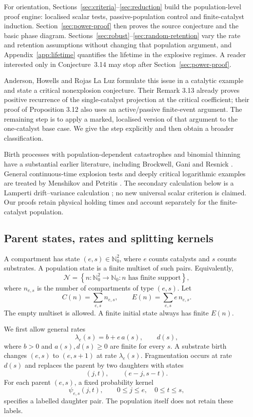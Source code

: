 \documentclass[11pt,a4paper]{article}
\theoremstyle{remark}\newtheorem{remark}[theorem]{Remark}
\newcommand{\Nzero}{\mathbb N_0}
\newcommand{\state}{\mathcal N}
\begin{document}
For orientation, Sections~\ref{sec:criteria}--\ref{sec:reduction} build the population-level proof engine: localised scalar tests, passive-population control and finite-catalyst induction. Section~\ref{sec:power-proof} then proves the source conjecture and the basic phase diagram. Sections~\ref{sec:robust}--\ref{sec:random-retention} vary the rate and retention assumptions without changing that population argument, and Appendix~\ref{app:lifetime} quantifies the lifetime in the explosive regimes. A reader interested only in Conjecture~3.14 may stop after Section~\ref{sec:power-proof}.

Anderson, Howells and Rojas La Luz \cite{anderson2026} formulate this issue in a catalytic example and state a critical nonexplosion conjecture. Their Remark 3.13 already proves positive recurrence of the single-catalyst projection at the critical coefficient; their proof of Proposition 3.12 also uses an active/passive finite-event argument. The remaining step is to apply a marked, localised version of that argument to the one-catalyst base case. We give the step explicitly and then obtain a broader classification.

Birth processes with population-dependent catastrophes and binomial thinning have a substantial earlier literature, including Brockwell, Gani and Resnick \cite{brockwell1982}. General continuous-time explosion tests and deeply critical logarithmic examples are treated by Menshikov and Petritis \cite{menshikov2014}. The secondary calculation below is a Lamperti drift--variance calculation \cite{lamperti1960,lo2024}; no new universal scalar criterion is claimed. Our proofs retain physical holding times and account separately for the finite-catalyst population.

\subsection{Parent states, rates and splitting kernels}

A compartment has state $(e,s)\in\Nzero^2$, where $e$ counts catalysts and $s$ counts substrates. A population state is a finite multiset of such pairs. Equivalently,
\[
\state=\left\{n:\Nzero^2\longrightarrow\Nzero:
                    n\text{ has finite support}\right\},
\]
where $n_{e,s}$ is the number of compartments of type $(e,s)$. Let
\[
C(n)=\sum_{e,s}n_{e,s},\qquad
E(n)=\sum_{e,s}e\,n_{e,s}.
\]
The empty multiset is allowed. A finite initial state always has finite $E(n)$.

We first allow general rates
\begin{equation}\label{eq:rates-general}
\lambda_e(s)=b+e\,a(s),\qquad d(s),
\end{equation}
where $b>0$ and $a(s),d(s)\ge0$ are finite for every $s$. A substrate birth changes $(e,s)$ to $(e,s+1)$ at rate $\lambda_e(s)$. Fragmentation occurs at rate $d(s)$ and replaces the parent by two daughters with states
\[
(j,t),\qquad(e-j,s-t).
\]
For each parent $(e,s)$, a fixed probability kernel
\[
\psi_{e,s}(j,t),\qquad 0\le j\le e,\quad 0\le t\le s,
\]
specifies a labelled daughter pair. The population itself does not retain these labels.
\end{document}

